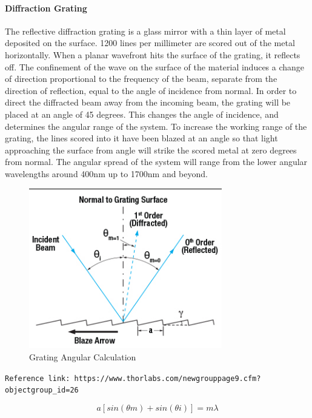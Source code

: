\paragraph{Diffraction Grating} The reflective diffraction grating is a glass mirror with a thin layer of metal deposited on the surface. 1200 lines per millimeter are scored out of the metal horizontally. When a planar wavefront hits the surface of the grating, it reflects off. The confinement of the wave on the surface of the material induces a change of direction proportional to the frequency of the beam, separate from the direction of reflection, equal to the angle of incidence from normal. In order to direct the diffracted beam away from the incoming beam, the grating will be placed at an angle of 45 degrees. This changes the angle of incidence, and determines the angular range of the system. To increase the working range of the grating, the lines scored into it have been blazed at an angle so that light approaching the surface from angle will strike the scored metal at zero degrees from normal. The angular spread of the system will range from the lower angular wavelengths around 400nm up to 1700nm and beyond. 
\begin{figure}[H]
    \caption{Grating Angular Calculation}
    \centering
    \includegraphics[width=0.75\textwidth]{images/ThorlabsGratingTutorial.png}
\end{figure}
\verb"Reference link: https://www.thorlabs.com/newgrouppage9.cfm?objectgroup_id=26"

\begin{equation}
    a[sin(\theta m)+sin(\theta i)] = m\lambda
\end{equation}

